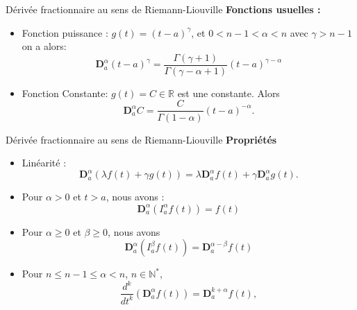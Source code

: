 \documentclass{sintefbeamer}
\begin{document}
\begin{frame}{Dérivée fractionnaire au sens de Riemann-Liouville}
    \textbf{Fonctions usuelles :}
    \begin{itemize}
        \item Fonction puissance : $g(t)=(t-a)^\gamma$, et $0<n-1<\alpha<n$ avec $\gamma > n-1$ on a alors:
        \begin{equation}
            \textbf{D}_a^{\alpha} (t-a)^{\gamma}=\frac{\Gamma(\gamma+1)}{\Gamma(\gamma - \alpha +1)}(t-a)^{\gamma - \alpha}
        \end{equation} 
        \item Fonction Constante: $g(t) =C \in \mathbb{R}$ est une constante. Alors 
\begin{equation}
    \textbf{D}_a^{\alpha} C=\frac{C}{\Gamma(1-\alpha)}(t-a)^{-\alpha}.
\end{equation}
    \end{itemize}
\end{frame}

\begin{frame}{Dérivée fractionnaire au sens de Riemann-Liouville}
    \textbf{Propriétés}
    \begin{itemize}
        \item Linéarité : \begin{equation}
    \textbf{D}_a^{\alpha}(\lambda f(t) + \gamma g(t)) = \lambda\textbf{D}_a^{\alpha} f(t) +\gamma\textbf{D}_a^{\alpha} g(t).
\end{equation}
\item Pour $\alpha>0$ et $t>a$, nous avons :
\begin{equation}
    \textbf{D}_a^{\alpha}\left(I_a^{\alpha}f(t)\right) = f(t)
\end{equation}
\item Pour $\alpha \geq 0$ et $\beta \geq 0$, nous avons
\begin{equation*}
    \textbf{D}_a^{\alpha}\left(I_a^{\beta} f(t)\right) = \textbf{D}_a^{\alpha - \beta} f(t)
\end{equation*}
\item Pour $n \leq n-1 \leq \alpha < n$, $n\in \mathbb{N^*}$,
\begin{equation}
    \frac{d^k}{dt^k} \left( \textbf{D}_a^{\alpha} f(t) \right) = \textbf{D}_a^{k+\alpha} f(t),
\end{equation}
    \end{itemize}
\end{frame}
\end{document}
